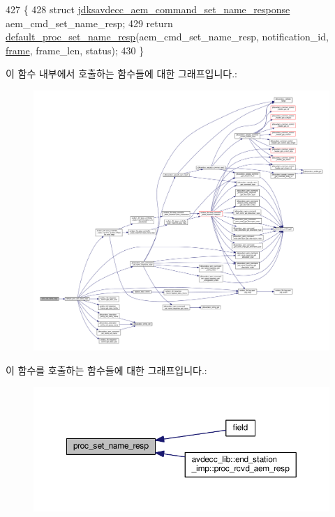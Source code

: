 \begin{DoxyCode}
427 \{
428     \textcolor{keyword}{struct }\hyperlink{structjdksavdecc__aem__command__set__name__response}{jdksavdecc\_aem\_command\_set\_name\_response} 
      aem\_cmd\_set\_name\_resp;
429     \textcolor{keywordflow}{return} \hyperlink{classavdecc__lib_1_1descriptor__base__imp_a2f52c3b9a7ad6f490bed0c96a9136bc3}{default\_proc\_set\_name\_resp}(aem\_cmd\_set\_name\_resp, notification\_id, 
      \hyperlink{gst__avb__playbin_8c_ac8e710e0b5e994c0545d75d69868c6f0}{frame}, frame\_len, status);
430 \}
\end{DoxyCode}


이 함수 내부에서 호출하는 함수들에 대한 그래프입니다.\+:
\nopagebreak
\begin{figure}[H]
\begin{center}
\leavevmode
\includegraphics[width=350pt]{classavdecc__lib_1_1descriptor__base__imp_a182c43d9f31980bb74f05956b1323624_cgraph}
\end{center}
\end{figure}




이 함수를 호출하는 함수들에 대한 그래프입니다.\+:
\nopagebreak
\begin{figure}[H]
\begin{center}
\leavevmode
\includegraphics[width=350pt]{classavdecc__lib_1_1descriptor__base__imp_a182c43d9f31980bb74f05956b1323624_icgraph}
\end{center}
\end{figure}


